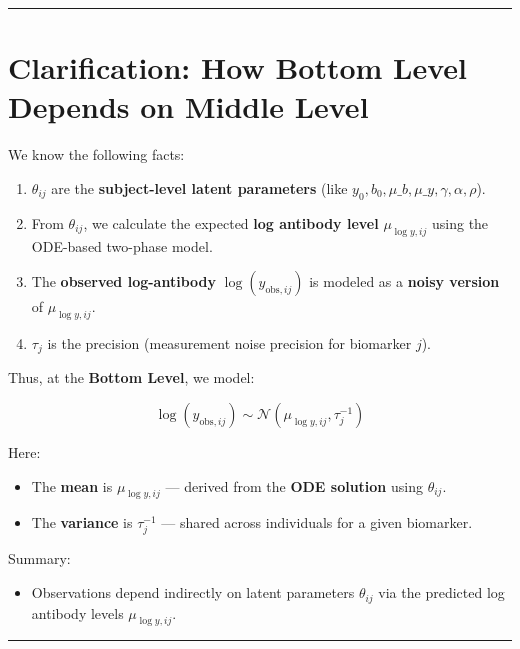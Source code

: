 \documentclass[
]{article}
\providecommand{\tightlist}{%
  \setlength{\itemsep}{0pt}\setlength{\parskip}{0pt}}\usepackage{longtable,booktabs,array}
\begin{document}
\begin{center}\rule{0.5\linewidth}{0.5pt}\end{center}

\section{Clarification: How Bottom Level Depends on Middle
Level}\label{clarification-how-bottom-level-depends-on-middle-level}

We know the following facts:

\begin{enumerate}
\def\labelenumi{\arabic{enumi}.}
\tightlist
\item
  \(\theta_{ij}\) are the \textbf{subject-level latent parameters} (like
  \(y_0, b_0, \mu\_b, \mu\_y, \gamma, \alpha, \rho\)).
\item
  From \(\theta_{ij}\), we calculate the expected \textbf{log antibody
  level} \(\mu_{\log y,ij}\) using the ODE-based two-phase model.
\item
  The \textbf{observed log-antibody} \(\log(y_{\text{obs},ij})\) is
  modeled as a \textbf{noisy version} of \(\mu_{\log y,ij}\).
\item
  \(\tau_j\) is the precision (measurement noise precision for biomarker
  \(j\)).
\end{enumerate}

Thus, at the \textbf{Bottom Level}, we model:

\[
\log(y_{\text{obs},ij}) \sim \mathcal{N}(\mu_{\log y,ij}, \tau_j^{-1})
\]

Here:

\begin{itemize}
\tightlist
\item
  The \textbf{mean} is \(\mu_{\log y,ij}\) --- derived from the
  \textbf{ODE solution} using \(\theta_{ij}\).
\item
  The \textbf{variance} is \(\tau_j^{-1}\) --- shared across individuals
  for a given biomarker.
\end{itemize}

Summary:

\begin{itemize}
\tightlist
\item
  Observations depend indirectly on latent parameters \(\theta_{ij}\)
  via the predicted log antibody levels \(\mu_{\log y,ij}\).
\end{itemize}

\begin{center}\rule{0.5\linewidth}{0.5pt}\end{center}
\end{document}
